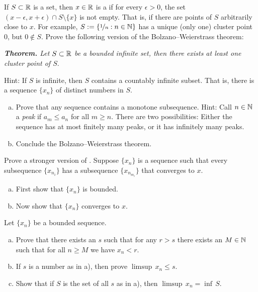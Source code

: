 \begin{exercise}
If $S \subset {\mathbb{R}}$ is a set, then $x \in {\mathbb{R}}$ is a \emph{}
if for every $\epsilon > 0$, the set $(x-\epsilon,x+\epsilon) \cap S
\setminus \{ x \}$ is not empty.  That is, if there are points of $S$
arbitrarily close to $x$.
For example, $S := \{ \nicefrac{1}{n} : n \in {\mathbb{N}} \}$ has a unique (only
one) cluster point $0$, but $0 \notin S$.
Prove the following version of the Bolzano--Weierstrass theorem:

\medskip

\noindent
\emph{\textbf{Theorem.} Let $S \subset {\mathbb{R}}$ be a bounded infinite set,
then there exists at least one cluster point of $S$}.

\medskip

Hint: If $S$ is infinite, then $S$ contains a countably infinite subset.
That is, there is a sequence $\{ x_n \}$ of distinct numbers in $S$.
\end{exercise}

\begin{samepage}
\begin{exercise}[Challenging]
\leavevmode
\begin{enumerate}[a)]
\item
Prove that any sequence contains a monotone subsequence.
Hint: Call $n \in {\mathbb{N}}$ a \emph{peak} if $a_m \leq a_n$ for all $m \geq n$.  
There are two possibilities: Either the sequence has at most finitely many
peaks,
or it has infinitely many peaks.
\item
Conclude the Bolzano--Weierstrass theorem.
\end{enumerate}
\end{exercise}
\end{samepage}

\begin{exercise}
Prove a stronger version of .
Suppose $\{ x_n \}$ is a sequence such that every subsequence $\{
x_{n_i} \}$ has a subsequence
$\{ x_{n_{m_i}} \}$ that converges to $x$.
\begin{enumerate}[a)]
\item
First show that $\{ x_n \}$ is
bounded.
\item
Now show that $\{ x_n \}$ converges to $x$.
\end{enumerate}
\end{exercise}

\begin{exercise}
Let $\{x_n\}$ be a bounded sequence.
\begin{enumerate}[a)]
\item
Prove that there exists an $s$ such that for any $r > s$ there exists 
an $M \in {\mathbb{N}}$ such that for all $n \geq M$ we have
$x_n < r$.
\item
If $s$ is a number as in a), then prove $\limsup \, x_n \leq s$.
\item
Show that if $S$ is the set of all $s$ as in a), then
$\limsup \, x_n = \inf \, S$.
\end{enumerate}
\end{exercise}

